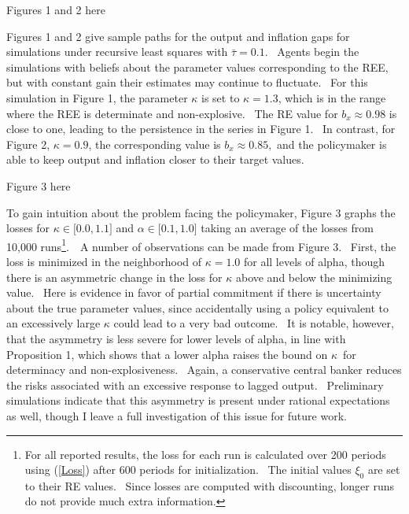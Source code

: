 \documentclass{article}
\begin{document}
\begin{doublespace}
\begin{center}
Figures 1 and 2 here
\end{center}

Figures 1 and 2 give sample paths for the output and inflation gaps for
simulations under recursive least squares with $\bar{\tau}=0.1$. \ Agents
begin the simulations with beliefs about the parameter values corresponding
to the REE, but with constant gain their estimates may continue to
fluctuate. \ For this simulation in Figure 1, the parameter $\kappa $ is set
to $\kappa =1.3$, which is in the range where the REE is determinate and
non-explosive. \ The RE value for $b_{x}\approx 0.98$ is close to one,
leading to the persistence in the series in Figure 1. \ In contrast, for
Figure 2, $\kappa =0.9$, the corresponding value is $b_{x}\approx 0.85,$ and
the policymaker is able to keep output and inflation closer to their target
values.

\begin{center}
Figure 3 here
\end{center}

To gain intuition about the problem facing the policymaker, Figure 3 graphs
the losses for $\kappa \in \lbrack 0.0,1.1]$ and $\alpha \in \lbrack
0.1,1.0] $ taking an average of the losses from 10,000 runs\footnote{%
For all reported results, the loss for each run is calculated over 200
periods using (\ref{Loss}) after 600 periods for initialization. \ The
initial values $\xi _{0}$ are set to their RE values. \ Since losses are
computed with discounting, longer runs do not provide much extra information.%
}.\ \ A number of observations can be made from Figure 3. \ First, the loss
is minimized in the neighborhood of $\kappa =1.0$ for all levels of alpha,
though there is an asymmetric change in the loss for $\kappa $ above and
below the minimizing value. \ Here is evidence in favor of partial
commitment if there is uncertainty about the true parameter values, since
accidentally using a policy equivalent to an excessively large $\kappa $
could lead to a very bad outcome. \ It is notable, however, that the
asymmetry is less severe for lower levels of alpha, in line with Proposition
1, which shows that a lower alpha raises the bound on $\kappa $\ for
determinacy and non-explosiveness. \ Again, a conservative central banker
reduces the risks associated with an excessive response to lagged output. \
Preliminary simulations indicate that this asymmetry is present under
rational expectations as well, though I leave a full investigation of this
issue for future work.


\end{doublespace}
\end{document}

